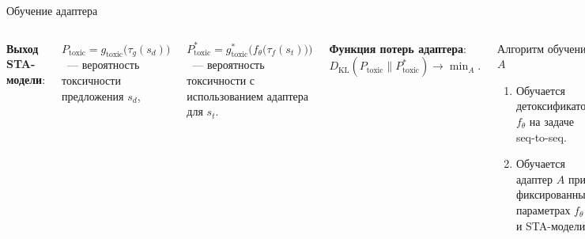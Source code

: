 \documentclass[12pt, fleqn, xcolor=x11names, xcolor=table, aspectratio=169]{beamer}
\begin{document}
\begin{frame}{Обучение адаптера}
\begin{columns}[c]

\textbf{Выход STA-модели}:

$P_{\text{toxic}} =g_{\text{toxic}}\bigl(\tau_{g}(s_d) \bigr)$~--- вероятность токсичности предложения $s_d$,

$P^{*}_{\text{toxic}} = g^{*}_{\text{toxic}} \bigl(f_{\theta} \bigl(\tau_{f}(s_t)\bigr) \bigr)$~--- вероятность токсичности с использованием адаптера для $s_t$. 

 

\vfill

\textbf{Функция потерь адаптера}: 
$D_\text{KL}(P_{\text{toxic}} \parallel P^{*}_{\text{toxic}}) \longrightarrow \min_{A}.$

\vfill

\begin{alertblock}{Алгоритм обучения $A$}
\begin{enumerate}
    \item Обучается детоксификатор $f_{\theta}$ на задаче seq-to-seq.
    \item Обучается адаптер $A$ при фиксированных параметрах $f_{\theta}$ и STA-модели.
\end{enumerate}
\end{alertblock}

\includegraphics[width=1.5\textwidth, left]{images/pres_adapter_train2.pdf}
\end{columns} 
\end{frame}
\end{document}
